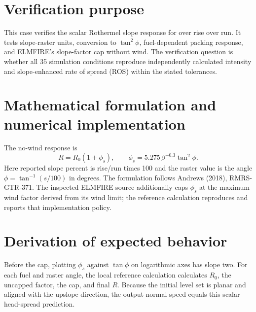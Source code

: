 \section{Verification purpose}

This case verifies the scalar Rothermel slope response for \FuelSet{} over \SlopeSet{} rise over run.  It tests slope-raster units, conversion to $\tan^2\phi$, fuel-dependent packing response, and ELMFIRE's slope-factor cap without wind.  The verification question is whether all 35 simulation conditions reproduce independently calculated intensity and slope-enhanced rate of spread (ROS) within the stated tolerances.

\section{Mathematical formulation and numerical implementation}
The no-wind response is
\begin{equation}R=R_0(1+\phi_s),\qquad \phi_s=5.275\,\beta^{-0.3}\tan^2\phi .\end{equation}
Here reported slope percent is rise/run times 100 and the raster value is the angle $\phi=\tan^{-1}(s/100)$ in degrees.  The formulation follows Andrews (2018), RMRS-GTR-371.  The inspected ELMFIRE source additionally caps $\phi_s$ at the maximum wind factor derived from its wind limit; the reference calculation reproduces and reports that implementation policy.

\section{Derivation of expected behavior}
Before the cap, plotting $\phi_s$ against $\tan\phi$ on logarithmic axes has slope two.  For each fuel and raster angle, the local reference calculation calculates $R_0$, the uncapped factor, the cap, and final $R$.  Because the initial level set is planar and aligned with the upslope direction, the output normal speed equals this scalar head-spread prediction.

